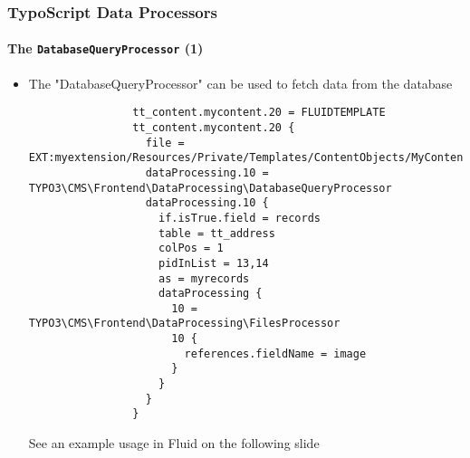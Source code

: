 \begin{frame}[fragile]
	\frametitle{TypoScript Data Processors}
	\framesubtitle{The \texttt{DatabaseQueryProcessor} (1)}

	\lstset{basicstyle=\tiny\ttfamily}

	\begin{itemize}

		\item The "DatabaseQueryProcessor" can be used to fetch data from the database

			\begin{lstlisting}
				tt_content.mycontent.20 = FLUIDTEMPLATE
				tt_content.mycontent.20 {
				  file = EXT:myextension/Resources/Private/Templates/ContentObjects/MyContent.html
				  dataProcessing.10 = TYPO3\CMS\Frontend\DataProcessing\DatabaseQueryProcessor
				  dataProcessing.10 {
				    if.isTrue.field = records
				    table = tt_address
				    colPos = 1
				    pidInList = 13,14
				    as = myrecords
				    dataProcessing {
				      10 = TYPO3\CMS\Frontend\DataProcessing\FilesProcessor
				      10 {
				        references.fieldName = image
				      }
				    }
				  }
				}
			\end{lstlisting}


			\vspace{-0.2cm}
			\small
				See an example usage in Fluid on the following slide
			\normalsize

	\end{itemize}

\end{frame}


